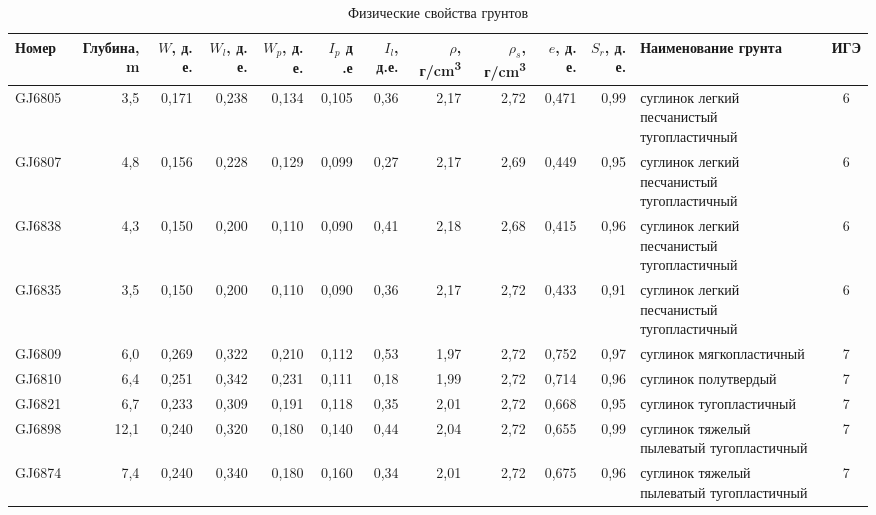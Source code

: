 \begin{table}
    \centering
    \tiny
    \caption{Физические свойства грунтов}
    \begin{tabular}{@{}|l|r|r|r|r|r|r|r|r|r|r|l|c|@{}}
    \hline
    Номер  & Глубина, \si{\meter} & $W$, д. е. & $W_l$, д. е. & $W_p$, д. е. & $I_p$ д .е & $I_l$, д.е. & $\rho$, г/\si{\centi\meter^3} & $\rho_s$, г/\si{\centi\meter^3} & $e$, д. е. & $S_r$, д. е. & Наименование   грунта                        & ИГЭ \\ \hline
    GJ6805          & 3,5        & 0,171                        & 0,238   & 0,134  & 0,105  & 0,36     & 2,17     & 2,72      & 0,471   & 0,99     & суглинок легкий   песчанистый тугопластичный & 6   \\ \hline
    GJ6807          & 4,8        & 0,156                        & 0,228   & 0,129  & 0,099  & 0,27     & 2,17     & 2,69      & 0,449   & 0,95     & суглинок легкий   песчанистый тугопластичный & 6   \\ \hline
    GJ6838          & 4,3        & 0,150                        & 0,200   & 0,110  & 0,090  & 0,41     & 2,18     & 2,68      & 0,415   & 0,96     & суглинок легкий   песчанистый тугопластичный & 6   \\\hline
    GJ6835          & 3,5        & 0,150                        & 0,200   & 0,110  & 0,090  & 0,36     & 2,17     & 2,72      & 0,433   & 0,91     & суглинок легкий   песчанистый тугопластичный & 6   \\ \hline
    GJ6809          & 6,0        & 0,269                        & 0,322   & 0,210  & 0,112  & 0,53     & 1,97     & 2,72      & 0,752   & 0,97     & суглинок   мягкопластичный                   & 7   \\ \hline
    GJ6810          & 6,4        & 0,251                        & 0,342   & 0,231  & 0,111  & 0,18     & 1,99     & 2,72      & 0,714   & 0,96     & суглинок полутвердый                         & 7   \\ \hline
    GJ6821          & 6,7        & 0,233                        & 0,309   & 0,191  & 0,118  & 0,35     & 2,01     & 2,72      & 0,668   & 0,95     & суглинок   тугопластичный                    & 7   \\ \hline
    GJ6898          & 12,1       & 0,240                        & 0,320   & 0,180  & 0,140  & 0,44     & 2,04     & 2,72      & 0,655   & 0,99     & суглинок тяжелый   пылеватый тугопластичный  & 7   \\ \hline
    GJ6874          & 7,4        & 0,240                        & 0,340   & 0,180  & 0,160  & 0,34     & 2,01     & 2,72      & 0,675   & 0,96     & суглинок тяжелый   пылеватый тугопластичный  & 7   \\ \hline

\end{tabular}
\end{table}
